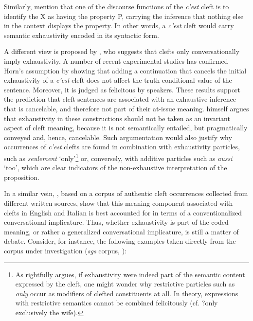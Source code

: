 Similarly, \textcite{lambrecht2001framework, katz1997syntactic} mention that one of the discourse functions of the \textit{c’est} cleft is to identify the X as having the property P, carrying the inference that nothing else in the context displays the property. In other words, a \textit{c’est }cleft would carry semantic exhaustivity encoded in its syntactic form.

A different view is proposed by \textcite{horn1981exhaustiveness}, who suggests that clefts only conversationally imply exhaustivity.
A number of recent experimental studies \parencite{destruel2018interpretation, de2018experimental} has confirmed Horn’s assumption by showing that adding a continuation that cancels the initial exhaustivity of a \textit{c’est} cleft does not affect the truth-conditional value of the sentence. Moreover, it is judged as felicitous by speakers. These results support the prediction that cleft sentences are associated with an exhaustive inference that is cancelable, and therefore not part of their at-issue meaning. \textcite{dufter2009clefting} himself argues that exhaustivity in these constructions should not be taken as an invariant aspect of cleft meaning, because it is not semantically entailed, but pragmatically conveyed and, hence, cancelable. Such argumentation would also justify why occurrences of \textit{c’est} clefts are found in combination with exhaustivity particles, such as \textit{seulement} ‘only’\footnote{As \textcite{dufter2009clefting} rightfully argues, if  exhaustivity were  indeed  part  of  the  semantic  content  expressed  by  the  cleft, one might wonder why restrictive particles such as \textit{only} occur as modifiers of clefted constituents at all. In theory, expressions  with  restrictive semantics cannot be combined felicitously (cf. ?only exclusively the wife).}  or, conversely, with additive particles such as \textit{aussi} ‘too’, which are clear indicators of the non-exhaustive interpretation of the proposition. 

In a similar vein, \textcite{de2015status}, based on a corpus of authentic cleft occurrences collected from different written sources, show that  this meaning component associated with clefts in English and Italian is best accounted for in terms of a conventionalized conversational implicature. Thus, whether exhaustivity is part of the coded meaning, or rather a generalized conversational implicature, is still a matter of debate. Consider, for instance, the following examples taken directly from the corpus under investigation (\textit{sgs} corpus, \cite{adli2011gradient}):

